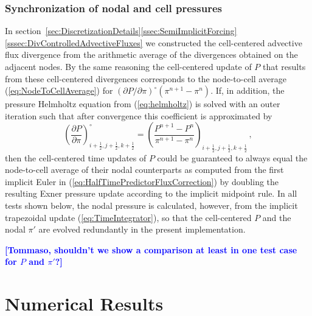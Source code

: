 \documentclass{ametsoc}
\newcommand{\blue}[1]{\textcolor{blue}{#1}}
\newcommand{\rupert}[1]{\blue{#1}}
\theoremstyle{definition}
\newcommand{\eq}[1]{(\ref{#1})}
\newcommand{\halff}{\frac{1}{2}}
\begin{document}

\subsubsection{Synchronization of nodal and cell pressures}
\label{ssec:SynchronizationChi}

In section~\ref{sec:DiscretizationDetails}\ref{ssec:SemiImplicitForcing}\ref{sssec:DivControlledAdvectiveFluxes} we constructed the cell-centered advective flux divergence from the arithmetic average of the divergences obtained on the adjacent nodes. By the same  reasoning the cell-centered update of $P$ that results from these cell-centered divergences corresponds to the node-to-cell average \eq{eq:NodeToCellAverage} for $(\partial P/\partial \pi)^{\circ} (\pi^{n+1}-\pi^{n})$. If, in addition, the pressure Helmholtz equation from \eq{eq:helmholtz} is solved with an outer iteration such that after convergence this coefficient is approximated by  
%
\begin{equation}
\left(\frac{\partial P}{\partial \pi}\right)^{\circ}_{i+\halff,j+\halff,k+\halff}
= \left(\frac{P^{n+1} - P^{n}}{\pi^{n+1} - \pi^{n}}\right)_{i+\halff,j+\halff,k+\halff}\,,
\end{equation}
%
then the cell-centered time updates of $P$ could be guaranteed to always equal the node-to-cell average of their nodal counterparts as computed from the first implicit Euler in \eq{eq:HalfTimePredictorFluxCorrection} by doubling the resulting Exner pressure update according to the implicit midpoint rule. In all tests shown below, the nodal pressure is calculated, however, from the implicit trapezoidal update \eq{eq:TimeIntegrator}, so that the cell-centered $P$ and the nodal $\pi'$ are evolved redundantly in the present implementation.

\rupert{\bfseries [Tommaso, shouldn't we show a comparison at least
in one test case for $P$ and $\pi'$?]}


\section{Numerical Results}
\label{sec:Results}
\end{document}
